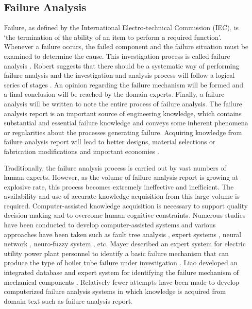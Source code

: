 \documentclass{elsart}
\begin{document}
\subsection{Failure Analysis
}
\label{sec:failure-analysis-}

Failure, as defined by the International Electro-technical Commission
(IEC), is ‘the termination of the ability of an item to perform a
required function’. Whenever a failure occurs, the
failed component and the failure situation must be examined to
determine the cause. This investigation process is called failure
analysis \cite{Liao1999}. Robert suggests that there should be a
systematic way of performing failure analysis and the investigation
and analysis process will follow a logical series of stages
\cite{roberts1980stm}. An opinion regarding the failure mechanism will
be formed and a final conclusion will be reached by the domain
experts. Finally, a failure analysis will be written to note the
entire process of failure analysis. The failure analysis report is an
important source of engineering knowledge, which contains substantial
and essential failure knowledge and conveys some inherent phenomena or
regularities about the processes generating failure. Acquiring
knowledge from failure analysis report will lead to better designs,
material selections or fabrication modifications and important
economies \cite{Castro2004}. 

Traditionally, the failure analysis process is carried out by vast
numbers of human experts. However, as the volume of failure analysis
report is growing at explosive rate, this process becomes extremely
ineffective and inefficient. The availability and use of accurate
knowledge acquisition from this large volume is
required. Computer-assisted knowledge acquisition is necessary to
support quality decision-making and to overcome human cognitive
constraints.  Numerous studies have been conducted to develop
computer-assisted systems and various approaches have been taken such
as fault tree analysis \cite{Israel2006}, expert systems \cite{Kim2004}, neural
network \cite{Zakarian1999}, neuro-fuzzy system \cite{Chen2006}, etc. Mayer described an expert system for electric utility power plant personnel to identify a basic failure mechanism that can produce the type of boiler tube failure under investigation \cite{Mayer1990}. Liao developed an integrated database and expert system for identifying the failure mechanism of mechanical components \cite{liao1999ida}. Relatively fewer attempts have been made to develop computerized failure analysis systems in which knowledge is acquired from domain text such as failure analysis report.
\end{document}
